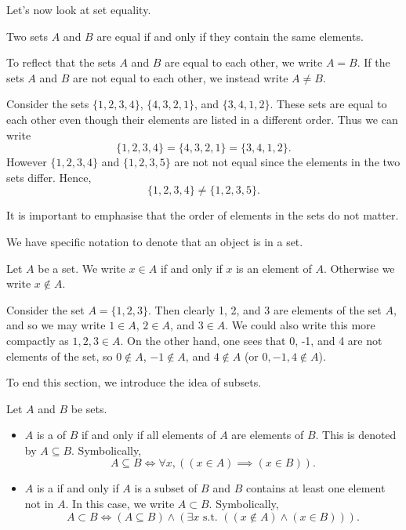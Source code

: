 Let's now look at set equality.

\begin{definition}
    Two sets $A$ and $B$ are equal if and only if they contain the same elements.
    
    To reflect that the sets $A$ and $B$ are equal to each other, we write $A = B$. If the sets $A$ and $B$ are not equal to each other, we instead write $A \neq B$.
\end{definition}

\begin{example}
    Consider the sets $\{1, 2, 3, 4\}$, $\{4, 3, 2, 1\}$, and $\{3, 4, 1, 2\}$. These sets are equal to each other even though their elements are listed in a different order. Thus we can write
    \[
        \{1, 2, 3, 4\} = \{4, 3, 2, 1\} = \{3, 4, 1, 2\}.
    \]
    However $\{1, 2, 3, 4\}$ and $\{1, 2, 3, 5\}$ are not not equal since the elements in the two sets differ. Hence,
    \[
        \{1, 2, 3, 4\} \neq \{1, 2, 3, 5\}.
    \]
\end{example}

It is important to emphasise that the order of elements in the sets do not matter.

We have specific notation to denote that an object is in a set.

\begin{definition}
    Let $A$ be a set. We write $x \in A$ if and only if $x$ is an element of $A$. Otherwise we write $x \notin A$.
\end{definition}

\begin{example}
    Consider the set $A = \{1, 2, 3\}$. Then clearly 1, 2, and 3 are elements of the set $A$, and so we may write $1 \in A$, $2 \in A$, and $3 \in A$. We could also write this more compactly as $1, 2, 3 \in A$. On the other hand, one sees that 0, -1, and 4 are not elements of the set, so $0 \notin A$, $-1 \notin A$, and $4 \notin A$ (or $0, -1, 4 \notin A$).
\end{example}

To end this section, we introduce the idea of subsets.

\begin{definition}[Subsets]
    Let $A$ and $B$ be sets.
    \begin{itemize}
        \item $A$ is a  of $B$ if and only if all elements of $A$ are elements of $B$. This is denoted by $A \subseteq B$. Symbolically,
        \[
            A \subseteq B \iff \forall x, ((x \in A) \implies (x \in B)).
        \]
        \item $A$ is a  if and only if $A$ is a subset of $B$ and $B$ contains at least one element not in $A$. In this case, we write $A \subset B$. Symbolically,
        \[
            A \subset B \iff (A \subseteq B) \land (\exists x \text{ s.t. } ((x \notin A) \land (x \in B))).
        \]
    \end{itemize}
\end{definition}

